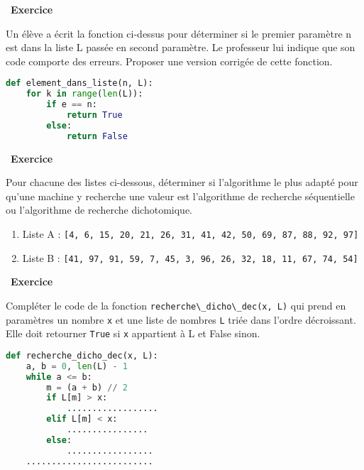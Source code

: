\documentclass[
  11pt,
]{article}
\newcommand{\passthrough}[1]{#1}
\providecommand{\tightlist}{%
  \setlength{\itemsep}{0pt}\setlength{\parskip}{0pt}}
\newcounter{exo}
\newenvironment{exercice}[1]
{\par \medskip   \addtocounter{exo}{1} \noindent  
\begin{bclogo}[arrondi =0.1,   noborder = true, logo=\bccrayon, marge=4]{~\textbf{Exercice} \textbf{\theexo} {\itshape #1} }  \par}
{
\end{bclogo}
 \par \bigskip }
\newcounter{thme}
\newcounter{def}
\newcounter{alg}
\begin{document}
\begin{exercice}{}

Un élève a écrit la fonction ci-dessus pour déterminer si le premier
paramètre n est dans la liste L passée en second paramètre. Le
professeur lui indique que son code comporte des erreurs. Proposer une
version corrigée de cette fonction.

\begin{lstlisting}[language=Python]
def element_dans_liste(n, L):
    for k in range(len(L)):
        if e == n:
            return True
        else:
            return False
\end{lstlisting}

\end{exercice}

\begin{exercice}{}

Pour chacune des listes ci-dessous, déterminer si l'algorithme le plus
adapté pour qu'une machine y recherche une valeur est l'algorithme de
recherche séquentielle ou l'algorithme de recherche dichotomique.

\begin{enumerate}
\def\labelenumi{\arabic{enumi}.}
\tightlist
\item
  Liste A :
  \passthrough{\lstinline![4, 6, 15, 20, 21, 26, 31, 41, 42, 50, 69, 87, 88, 92, 97]!}
\item
  Liste B :
  \passthrough{\lstinline![41, 97, 91, 59, 7, 45, 3, 96, 26, 32, 18, 11, 67, 74, 54]!}
\end{enumerate}

\end{exercice}

\begin{exercice}{}

Compléter le code de la fonction
\passthrough{\lstinline!recherche\_dicho\_dec(x, L)!} qui prend en
paramètres un nombre \passthrough{\lstinline!x!} et une liste de nombres
\passthrough{\lstinline!L!} triée dans l'ordre décroissant. Elle doit
retourner \passthrough{\lstinline!True!} si \passthrough{\lstinline!x!}
appartient à L et False sinon.

\begin{lstlisting}[language=Python]
def recherche_dicho_dec(x, L):
    a, b = 0, len(L) - 1
    while a <= b:
        m = (a + b) // 2
        if L[m] > x:
            ..................
        elif L[m] < x:
            ................
        else:
            .................
    .........................
\end{lstlisting}

\end{exercice}
\end{document}

